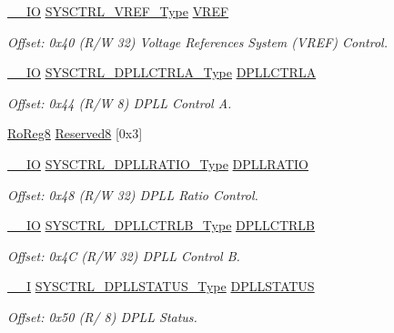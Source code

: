 \begin{DoxyCompactItemize}
\item 
\mbox{\hyperlink{core__cm0plus_8h_aec43007d9998a0a0e01faede4133d6be}{\+\_\+\+\_\+\+IO}} \mbox{\hyperlink{union_s_y_s_c_t_r_l___v_r_e_f___type}{S\+Y\+S\+C\+T\+R\+L\+\_\+\+V\+R\+E\+F\+\_\+\+Type}} \mbox{\hyperlink{struct_sysctrl_a19869edd9d8d89257a60e585a700e028}{V\+R\+EF}}
\begin{DoxyCompactList}\small\item\em Offset\+: 0x40 (R/W 32) Voltage References System (V\+R\+EF) Control. \end{DoxyCompactList}\item 
\mbox{\hyperlink{core__cm0plus_8h_aec43007d9998a0a0e01faede4133d6be}{\+\_\+\+\_\+\+IO}} \mbox{\hyperlink{union_s_y_s_c_t_r_l___d_p_l_l_c_t_r_l_a___type}{S\+Y\+S\+C\+T\+R\+L\+\_\+\+D\+P\+L\+L\+C\+T\+R\+L\+A\+\_\+\+Type}} \mbox{\hyperlink{struct_sysctrl_aa8587a145ac2dff5a1425faf5bc7c6c0}{D\+P\+L\+L\+C\+T\+R\+LA}}
\begin{DoxyCompactList}\small\item\em Offset\+: 0x44 (R/W 8) D\+P\+LL Control A. \end{DoxyCompactList}\item 
\mbox{\hyperlink{group___s_a_m_d21_e15_a__definitions_ga0d957f1433aaf5d70e4dc2b68288442d}{Ro\+Reg8}} \mbox{\hyperlink{struct_sysctrl_a11a6ab8b475e798e523ab47d900dc426}{Reserved8}} \mbox{[}0x3\mbox{]}
\item 
\mbox{\hyperlink{core__cm0plus_8h_aec43007d9998a0a0e01faede4133d6be}{\+\_\+\+\_\+\+IO}} \mbox{\hyperlink{union_s_y_s_c_t_r_l___d_p_l_l_r_a_t_i_o___type}{S\+Y\+S\+C\+T\+R\+L\+\_\+\+D\+P\+L\+L\+R\+A\+T\+I\+O\+\_\+\+Type}} \mbox{\hyperlink{struct_sysctrl_a70ffba38ed4ce7b15fed4772764567b8}{D\+P\+L\+L\+R\+A\+T\+IO}}
\begin{DoxyCompactList}\small\item\em Offset\+: 0x48 (R/W 32) D\+P\+LL Ratio Control. \end{DoxyCompactList}\item 
\mbox{\hyperlink{core__cm0plus_8h_aec43007d9998a0a0e01faede4133d6be}{\+\_\+\+\_\+\+IO}} \mbox{\hyperlink{union_s_y_s_c_t_r_l___d_p_l_l_c_t_r_l_b___type}{S\+Y\+S\+C\+T\+R\+L\+\_\+\+D\+P\+L\+L\+C\+T\+R\+L\+B\+\_\+\+Type}} \mbox{\hyperlink{struct_sysctrl_a218349cb36190230b3285bf64b5f31e7}{D\+P\+L\+L\+C\+T\+R\+LB}}
\begin{DoxyCompactList}\small\item\em Offset\+: 0x4C (R/W 32) D\+P\+LL Control B. \end{DoxyCompactList}\item 
\mbox{\hyperlink{core__cm0plus_8h_af63697ed9952cc71e1225efe205f6cd3}{\+\_\+\+\_\+I}} \mbox{\hyperlink{union_s_y_s_c_t_r_l___d_p_l_l_s_t_a_t_u_s___type}{S\+Y\+S\+C\+T\+R\+L\+\_\+\+D\+P\+L\+L\+S\+T\+A\+T\+U\+S\+\_\+\+Type}} \mbox{\hyperlink{struct_sysctrl_a8e23ba910f1392daf817d67a3d15829d}{D\+P\+L\+L\+S\+T\+A\+T\+US}}
\begin{DoxyCompactList}\small\item\em Offset\+: 0x50 (R/ 8) D\+P\+LL Status. \end{DoxyCompactList}\end{DoxyCompactItemize}


